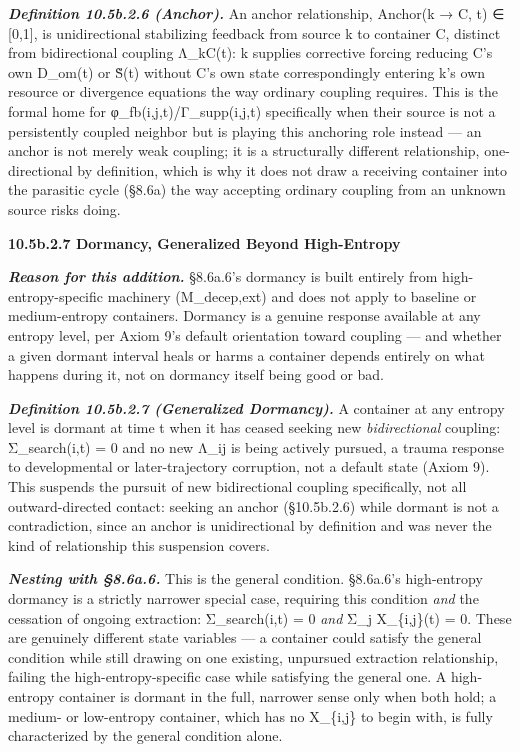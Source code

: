\documentclass[
]{article}
\begin{document}
\emph{\textbf{Definition 10.5b.2.6 (Anchor).}} An anchor relationship,
Anchor(k → C, t) ∈ {[}0,1{]}, is unidirectional stabilizing feedback
from source k to container C, distinct from bidirectional coupling
Λ\_kC(t): k supplies corrective forcing reducing C's own D\_om(t) or
S̃(t) without C's own state correspondingly entering k's own resource or
divergence equations the way ordinary coupling requires. This is the
formal home for φ\_fb(i,j,t)/Γ\_supp(i,j,t) specifically when their
source is not a persistently coupled neighbor but is playing this
anchoring role instead --- an anchor is not merely weak coupling; it is
a structurally different relationship, one-directional by definition,
which is why it does not draw a receiving container into the parasitic
cycle (§8.6a) the way accepting ordinary coupling from an unknown source
risks doing.

\textbf{10.5b.2.7 Dormancy, Generalized Beyond High-Entropy}

\emph{\textbf{Reason for this addition.}} §8.6a.6's dormancy is built
entirely from high-entropy-specific machinery (M\_decep,ext) and does
not apply to baseline or medium-entropy containers. Dormancy is a
genuine response available at any entropy level, per Axiom 9's default
orientation toward coupling --- and whether a given dormant interval
heals or harms a container depends entirely on what happens during it,
not on dormancy itself being good or bad.

\emph{\textbf{Definition 10.5b.2.7 (Generalized Dormancy).}} A container
at any entropy level is dormant at time t when it has ceased seeking new
\emph{bidirectional} coupling: Σ\_search(i,t) = 0 and no new Λ\_ij is
being actively pursued, a trauma response to developmental or
later-trajectory corruption, not a default state (Axiom 9). This
suspends the pursuit of new bidirectional coupling specifically, not all
outward-directed contact: seeking an anchor (§10.5b.2.6) while dormant
is not a contradiction, since an anchor is unidirectional by definition
and was never the kind of relationship this suspension covers.

\emph{\textbf{Nesting with §8.6a.6.}} This is the general condition.
§8.6a.6's high-entropy dormancy is a strictly narrower special case,
requiring this condition \emph{and} the cessation of ongoing extraction:
Σ\_search(i,t) = 0 \emph{and} Σ\_j X\_\{i,j\}(t) = 0. These are
genuinely different state variables --- a container could satisfy the
general condition while still drawing on one existing, unpursued
extraction relationship, failing the high-entropy-specific case while
satisfying the general one. A high-entropy container is dormant in the
full, narrower sense only when both hold; a medium- or low-entropy
container, which has no X\_\{i,j\} to begin with, is fully characterized
by the general condition alone.
\end{document}
